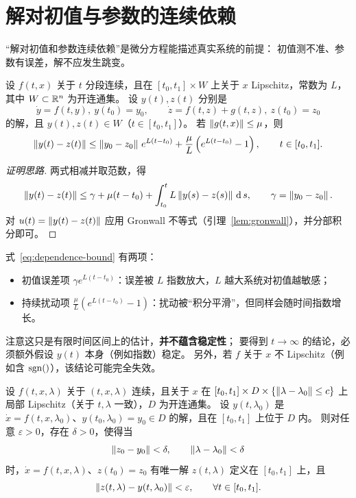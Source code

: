 \section{解对初值与参数的连续依赖}\label{sec:continuous-dependence}

“解对初值和参数连续依赖”是微分方程能描述真实系统的前提：
初值测不准、参数有误差，解不应发生跳变。

\begin{theorem}[有界扰动下的偏差估计]\label{thm:dependence-bound}
  设 $f(t,x)$ 关于 $t$ 分段连续，且在 $[t_0,t_1]\times W$ 上关于 $x$ Lipschitz，常数为 $L$，
  其中 $W\subset\mathbb{R}^n$ 为开连通集。
  设 $y(t),z(t)$ 分别是
  \[
    \dot y=f(t,y),\ y(t_0)=y_0,
    \qquad
    \dot z=f(t,z)+g(t,z),\ z(t_0)=z_0
  \]
  的解，且 $y(t),z(t)\in W$（$t\in[t_0,t_1]$）。
  若 $\left\lVert g(t,x)\right\rVert\le\mu$，则
  \begin{equation}\label{eq:dependence-bound}
    \left\lVert y(t)-z(t)\right\rVert
    \le\left\lVert y_0-z_0\right\rVert\,e^{L(t-t_0)}
    +\frac{\mu}{L}\left(e^{L(t-t_0)}-1\right),
    \qquad t\in[t_0,t_1].
  \end{equation}
  \cite[Theorem 3.4]{khalilNonlinearSystems}
\end{theorem}

\begin{proof}[证明思路]
  两式相减并取范数，得
  \[
    \left\lVert y(t)-z(t)\right\rVert\le\gamma+\mu(t-t_0)+\int_{t_0}^{t}L\left\lVert y(s)-z(s)\right\rVert\,\operatorname{d} s,
    \qquad \gamma=\left\lVert y_0-z_0\right\rVert.
  \]
  对 $u(t)=\left\lVert y(t)-z(t)\right\rVert$ 应用 Gronwall 不等式（引理~\ref{lem:gronwall}），并分部积分即可。
\end{proof}

\begin{remark}[怎样读这个界]
  式~\eqref{eq:dependence-bound} 有两项：
  \begin{itemize}
    \item 初值误差项 $\gamma e^{L(t-t_0)}$：误差被 $L$ 指数放大，$L$ 越大系统对初值越敏感；
    \item 持续扰动项 $\frac{\mu}{L}(e^{L(t-t_0)}-1)$：扰动被“积分平滑”，但同样会随时间指数增长。
  \end{itemize}
  注意这只是有限时间区间上的估计，\textbf{并不蕴含稳定性}；
  要得到 $t\to\infty$ 的结论，必须额外假设 $y(t)$ 本身（例如指数）稳定。
  另外，若 $f$ 关于 $x$ 不 Lipschitz（例如含 $\sgn$），该结论可能完全失效。
\end{remark}

\begin{theorem}[对初值与参数的连续依赖]\label{thm:continuous-dependence}
  设 $f(t,x,\lambda)$ 关于 $(t,x,\lambda)$ 连续，且关于 $x$ 在
  $[t_0,t_1]\times D\times\{\left\lVert\lambda-\lambda_0\right\rVert\le c\}$ 上局部 Lipschitz（关于 $t,\lambda$ 一致），$D$ 为开连通集。
  设 $y(t,\lambda_0)$ 是 $\dot x=f(t,x,\lambda_0)$、$y(t_0,\lambda_0)=y_0\in D$ 的解，且在 $[t_0,t_1]$ 上位于 $D$ 内。
  则对任意 $\varepsilon>0$，存在 $\delta>0$，使得当
  \[
    \left\lVert z_0-y_0\right\rVert<\delta,\qquad\left\lVert\lambda-\lambda_0\right\rVert<\delta
  \]
  时，$\dot x=f(t,x,\lambda)$、$z(t_0)=z_0$ 有唯一解 $z(t,\lambda)$ 定义在 $[t_0,t_1]$ 上，且
  \[
    \left\lVert z(t,\lambda)-y(t,\lambda_0)\right\rVert<\varepsilon,\qquad\forall t\in[t_0,t_1].
  \]
  \cite[Theorem 3.5]{khalilNonlinearSystems}
\end{theorem}

